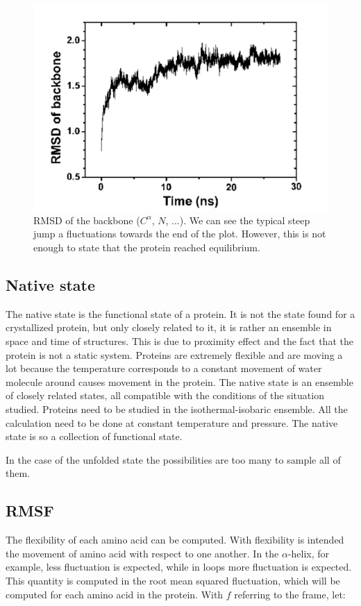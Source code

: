 		\begin{figure}[H]
			\centering
			\includegraphics[scale = 0.3]{rmsd.png}
			\caption{RMSD of the backbone ($C^{\alpha}$, $N$, ...). We can see the typical steep jump a fluctuations towards the end of the plot. However, this is not enough to state that the protein reached equilibrium.}
			\label{fig:rmsd}
			\end{figure}


	\subsection{Native state}
	The native state is the functional state of a protein.
	It is not the state found for a crystallized protein, but only closely related to it, it is rather an ensemble in space and time of structures.
	This is due to proximity effect and the fact that the protein is not a static system.
	Proteins are extremely flexible and are moving a lot because the temperature corresponds to a constant movement of water molecule around causes movement in the protein.
	The native state is an ensemble of closely related states, all compatible with the conditions of the situation studied.
	Proteins need to be studied in the isothermal-isobaric ensemble.
	All the calculation need to be done at constant temperature and pressure.
	The native state is so a collection of functional state.

	In the case of the unfolded state the possibilities are too many to sample all of them.

	\subsection{RMSF}
	The flexibility of each amino acid can be computed.
	With flexibility is intended the movement of amino acid with respect to one another.
	In the $\alpha$-helix, for example, less fluctuation is expected, while in loops more fluctuation is expected.
	This quantity is computed in the root mean squared fluctuation, which will be computed for each amino acid in the protein.
	With $f$ referring to the frame, let:

